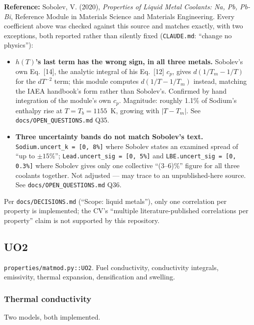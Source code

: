 \documentclass[11pt]{article}
\newcommand{\code}[1]{\texttt{#1}}
\begin{document}
\textbf{Reference:} Sobolev, V. (2020), \emph{Properties of Liquid Metal Coolants: Na,
Pb, Pb-Bi}, Reference Module in Materials Science and Materials Engineering. Every
coefficient above was checked against this source and matches exactly, with two
exceptions, both reported rather than silently fixed (\code{CLAUDE.md}: ``change no
physics''):

\begin{itemize}
  \item \textbf{$h(T)$'s last term has the wrong sign, in all three metals.} Sobolev's
    own Eq.\ [14], the analytic integral of his Eq.\ [12] $c_p$, gives
    $d(1/T_m - 1/T)$ for the $d T^{-2}$ term; this module computes $d(1/T - 1/T_m)$
    instead, matching the IAEA handbook's form rather than Sobolev's. Confirmed by hand
    integration of the module's own $c_p$. Magnitude: roughly 1.1\% of Sodium's
    enthalpy rise at $T=T_b=1155$~K, growing with $|T-T_m|$. See
    \code{docs/OPEN\_QUESTIONS.md} Q35.
  \item \textbf{Three uncertainty bands do not match Sobolev's text.} \code{Sodium.uncert\_k
    = [0, 8\%]} where Sobolev states an examined spread of ``up to $\pm15\%$'';
    \code{Lead.uncert\_sig = [0, 5\%]} and \code{LBE.uncert\_sig = [0, 0.3\%]} where
    Sobolev gives only one collective ``(3--6)\%'' figure for all three coolants
    together. Not adjusted --- may trace to an unpublished-here source. See
    \code{docs/OPEN\_QUESTIONS.md} Q36.
\end{itemize}

Per \code{docs/DECISIONS.md} (``Scope: liquid metals''), only one correlation per
property is implemented; the CV's ``multiple literature-published correlations per
property'' claim is not supported by this repository.

\subsection{UO2}

\code{properties/matmod.py::UO2}. Fuel conductivity, conductivity integrals,
emissivity, thermal expansion, densification and swelling.

\subsubsection{Thermal conductivity}

Two models, both implemented.
\end{document}

